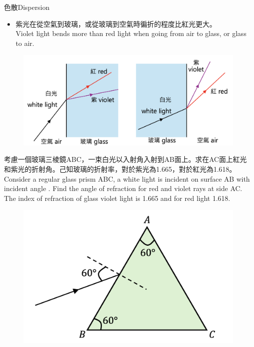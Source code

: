 \documentclass[beamer=true]{standalone}
\begin{document}
\begin{frame}{色散Dispersion}
    \begin{itemize}
        \item 紫光在從空氣到玻璃，或從玻璃到空氣時徧折的程度比紅光更大。\\Violet light bends more than red light when going from air to glass, or glass to air.
    \end{itemize}\bigskip
    \begin{figure}
        \centering
        \includegraphics[width=0.85\linewidth]{assets/8un981xue1.png}
    \end{figure}
\end{frame}

\begin{frame}{}
    
\end{frame}

\begin{eg}
    考慮一個玻璃三棱鏡ABC，一束白光以入射角入射到AB面上。求在AC面上紅光和紫光的折射角。己知玻璃的折射率，對於紫光為1.665，對於紅光為1.618。\\Consider a regular glass prism ABC, a white light is incident on surface AB with incident angle . Find the angle of refraction for red and violet rays at side AC. The index of refraction of glass violet light is 1.665 and for red light 1.618.
    \begin{figure}
        \centering
        \includegraphics[width=0.5\linewidth]{assets/dedwed2232321312.png}
    \end{figure}
\end{eg}
\end{document}
